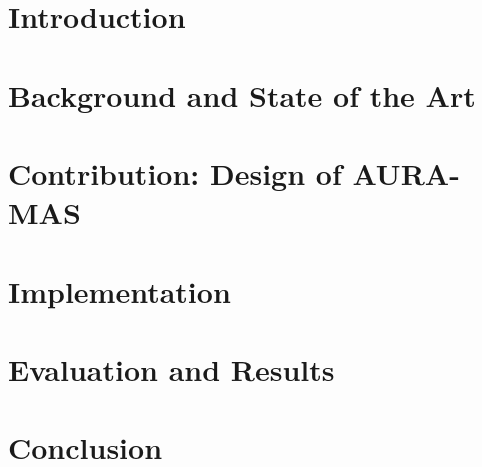 \documentclass[openany,12pt,oneside]{extreport}
\begin{document}
\newpage

\tableofcontents
\listoffigures
\listoftables
\printglossary[type=\acronymtype, title=Acronyms]
\clearpage

\part{Introduction}


\part{Background and State of the Art}




\part{Contribution: Design of AURA-MAS}


\part{Implementation}


\part{Evaluation and Results}


\part{Conclusion}


\appendix


\printbibliography[heading=bibintoc, title={References}]
\end{document}
